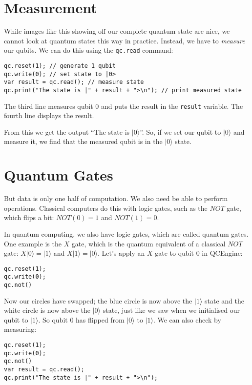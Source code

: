 \documentclass[twocolumn]{article}
\begin{document}
\section{Measurement}

While images like this showing off our complete quantum state are nice, we cannot look at quantum states this way in practice. Instead, we have to {\em measure} our qubits. We can do this using the \texttt{qc.read} command:
\\
\begin{lstlisting}
qc.reset(1); // generate 1 qubit
qc.write(0); // set state to |0>
var result = qc.read(); // measure state
qc.print("The state is |" + result + ">\n"); // print measured state
\end{lstlisting}

The third line measures qubit $0$ and puts the result in the \texttt{result} variable. The fourth line displays the result.

From this we get the output ``The state is $|0\rangle$''. So, if we set our qubit to $|0\rangle$ and measure it, we find that the measured qubit is in the $|0\rangle$ state.

\section{Quantum Gates}

But data is only one half of computation. We also need be able to perform operations. Classical computers do this with logic gates, such as the $NOT$ gate, which flips a bit: $NOT(0) = 1$ and $NOT(1) = 0$.

In quantum computing, we also have logic gates, which are called quantum gates. One example is the $X$ gate, which is the quantum equivalent of a classical $NOT$ gate: $X|0\rangle = |1\rangle$ and $X|1\rangle = |0\rangle$. Let's apply an $X$ gate to qubit $0$ in QCEngine:

\begin{lstlisting}
qc.reset(1);
qc.write(0);
qc.not()
\end{lstlisting}

Now our circles have swapped; the blue circle is now above the $|1\rangle$ state and the white circle is now above the $|0\rangle$ state, just like we saw when we initialised our qubit to $|1\rangle$. So qubit $0$ has flipped from $|0\rangle$ to $|1\rangle$. We can also check by measuring:

\begin{lstlisting}
qc.reset(1);
qc.write(0);
qc.not()
var result = qc.read();
qc.print("The state is |" + result + ">\n");
\end{lstlisting}
\end{document}
